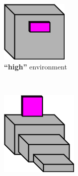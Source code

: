 \documentclass[12pt]{article}
\begin{document}
\begin{figure}
\begin{subfigure}[t]{0.45\columnwidth}
    \begin{subfigure}[t]{0.45\columnwidth}
        \includegraphics[width=\textwidth]{images/HighFreeEnvironment.png}
        \caption{\textbf{``high''} environment}
    \end{subfigure} \ \ \ \ \ \
    \begin{subfigure}[t]{0.45\columnwidth}
        \includegraphics[width=\textwidth]{images/LedgeEnvironment.png}

\end{subfigure}
\end{subfigure}
\end{figure}
\end{document}
